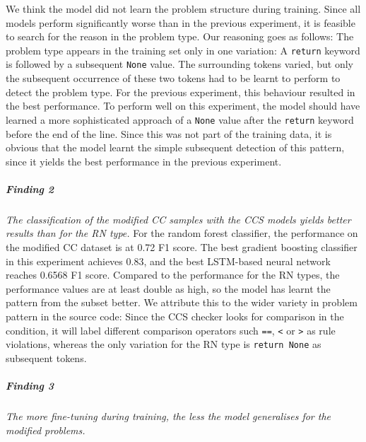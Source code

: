 We think the model did not learn the problem structure during training. Since all models perform significantly worse than in the previous experiment, it is feasible to search for the reason in the problem type. Our reasoning goes as follows:
The problem type appears in the training set only in one variation: A \texttt{return} keyword is followed by a subsequent \texttt{None} value. The surrounding tokens varied, but only the subsequent occurrence of these two tokens had to be learnt to perform to detect the problem type. For the previous experiment, this behaviour resulted in the best performance. To perform well on this experiment, the model should have learned a more sophisticated approach of a \texttt{None} value after the \texttt{return} keyword before the end of the line. Since this was not part of the training data, it is obvious that the model learnt the simple subsequent detection of this pattern, since it yields the best performance in the previous experiment.

\subparagraph{Finding 2}\label{finding:ccs_more_variety}
\textit{The classification of the modified CC samples with the CCS models yields better results than for the RN type.}
For the random forest classifier, the performance on the modified CC dataset is at 0.72 F1 score. The best gradient boosting classifier in this experiment achieves 0.83, and the best LSTM-based neural network reaches 0.6568 F1 score. 
Compared to the performance for the RN types, the performance values are at least double as high, so the model has learnt the pattern from the subset better. We attribute this to the wider variety in problem pattern in the source code: Since the CCS checker looks for comparison in the condition, it will label different comparison operators such \texttt{==}, \texttt{<} or \texttt{>} as rule violations, whereas the only variation for the RN type is \texttt{return None} as subsequent tokens.

\subparagraph{Finding 3}\label{finding:better_vs_worse}
\textit{The more fine-tuning during training, the less the model generalises for the modified problems.}

